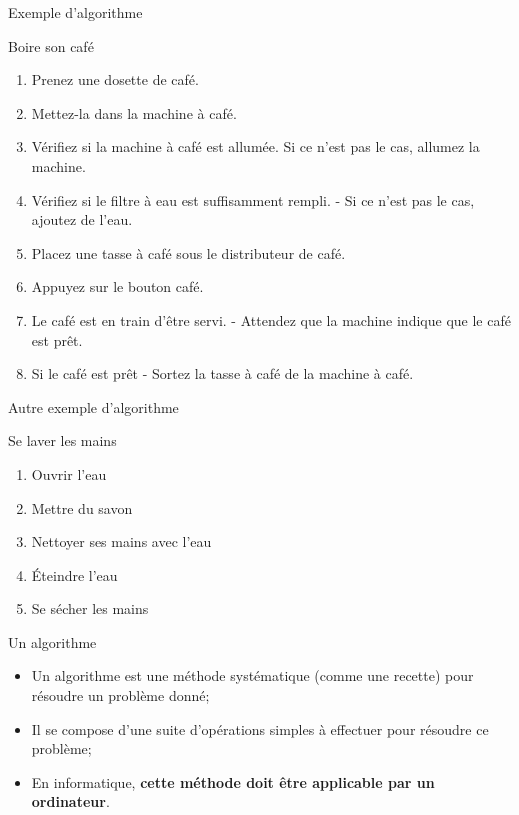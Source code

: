 \documentclass[10pt,xcolor=dvipsnames]{beamer}
\begin{document}
\begin{frame}{Exemple d'algorithme}
\begin{alertblock}{Boire son café}
\begin{enumerate}[<+->]
    \item Prenez une dosette de café.
    \item Mettez-la dans la machine à café.
    \item  Vérifiez si la machine à café est allumée. Si ce n'est pas le cas, allumez la machine.
    \item  Vérifiez si le filtre à eau est suffisamment rempli. - Si ce n'est pas le cas, ajoutez de l'eau.
    \item Placez une tasse à café sous le distributeur de café.
    \item Appuyez sur le bouton café.
    \item Le café est en train d'être servi. - Attendez que la machine indique que le café est prêt.
    \item Si le café est prêt - Sortez la tasse à café de la machine à café.
\end{enumerate}
\end{alertblock}

\end{frame}


\begin{frame}{Autre exemple d'algorithme}
\begin{alertblock}{Se laver les mains}
\begin{enumerate}[<+->]
\item Ouvrir l'eau
\item Mettre du savon
\item Nettoyer ses mains avec l'eau
\item Éteindre l'eau
\item Se sécher les mains
\end{enumerate}
\end{alertblock}
\begin{center}
\end{center}
\end{frame}

\begin{frame}{Un algorithme}
    \begin{itemize}
        \item Un algorithme est une méthode systématique (comme une recette) pour résoudre un problème donné;
        \item Il se compose d'une suite d'opérations simples à effectuer pour résoudre ce problème;
        \item En informatique, \textbf{cette méthode doit être applicable par un ordinateur}.
    \end{itemize}
\end{frame}
\end{document}
